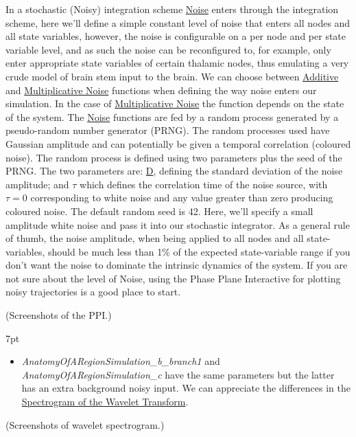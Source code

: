 \documentclass{tufte-handout}
\newenvironment{simulation}{%
  \def\FrameCommand{%
    \hspace{1pt}%
    {\color{ForestGreen}\vrule width 2pt}%
    {\color{simulationshade}\vrule width 4pt}%
    \colorbox{simulationshade}%
  }%
  \MakeFramed{\advance\hsize-\width\FrameRestore}%
  \noindent\hspace{-4.55pt}%
  \begin{adjustwidth}{}{7pt}%
  \vspace{2pt}\vspace{2pt}%
}
{%
  \vspace{2pt}\end{adjustwidth}\endMakeFramed%
}
\begin{document}
In a stochastic (Noisy) integration scheme \underline{Noise} enters through the integration
scheme, here we'll define a simple constant level of noise that enters all
nodes and all state variables, however, the noise is configurable on a per
node and per state variable level, and as such the noise can be reconfigured
to, for example, only enter appropriate state variables of certain thalamic
nodes, thus emulating a very crude model of brain stem input to the brain. We
can choose between \underline{Additive} and \underline{Multiplicative Noise} functions when defining
the way noise enters our simulation. In the case of \underline{Multiplicative Noise} the
function depends on the state of the system. The \underline{Noise} functions are fed by a
random process generated by a pseudo-random number generator (PRNG). The random
processes used have Gaussian amplitude and can potentially be given a temporal
correlation (coloured noise). The random process is defined using two
parameters plus the seed of the PRNG. The two parameters are: \underline{D}, defining the
standard deviation of the noise amplitude; and \underline{$\tau$} which defines the
correlation time of the noise source, with $\tau = 0$ corresponding to white
noise and any value greater than zero producing coloured noise. The default
random seed is 42. Here, we'll specify a small amplitude white noise and pass
it into our stochastic integrator. As a general rule of thumb, the noise
amplitude, when being applied to all nodes and all state-variables, should be
much less than 1\% of the expected state-variable range if you don't want the
noise to dominate the intrinsic dynamics of the system.
If you are not sure about the level of Noise, using the Phase Plane
Interactive for plotting noisy trajectories is a good place to start.



(Screenshots of the PPI.)


\begin{simulation}
\begin{itemize}
 \item \textit{AnatomyOfARegionSimulation\_b\_branch1} and \textit{AnatomyOfARegionSimulation\_c} have the same parameters but the latter has an extra background noisy input. We can appreciate the differences in the \underline{Spectrogram of the Wavelet Transform}.
\end{itemize}
\end{simulation}


(Screenshots of wavelet spectrogram.)
\end{document}
